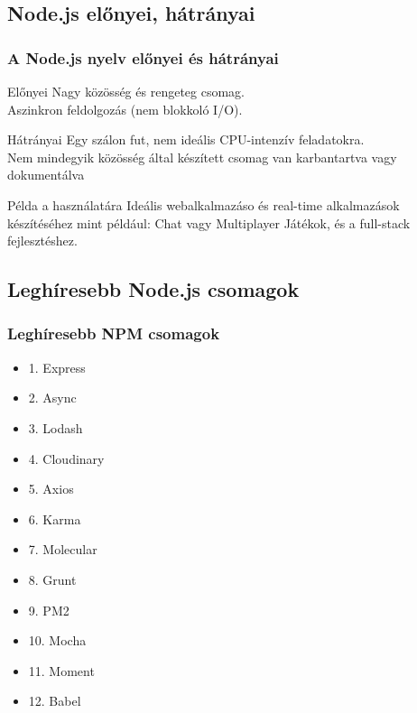 \documentclass[10pt]{beamer}
\begin{document}
	\subsection{Node.js előnyei, hátrányai}
	\begin{frame}
		\frametitle{A Node.js nyelv előnyei és hátrányai}

		\begin{block}{Előnyei}
			Nagy közösség és rengeteg csomag. \\ Aszinkron feldolgozás (nem blokkoló I/O).
		\end{block}
		\begin{alertblock}{Hátrányai}
			Egy szálon fut, nem ideális CPU-intenzív feladatokra. \\ Nem mindegyik közösség
			által készített csomag van karbantartva vagy dokumentálva
		\end{alertblock}
		\begin{exampleblock}{Példa a használatára}
			Ideális webalkalmazáso és real-time alkalmazások készítéséhez mint például:
			Chat vagy Multiplayer Játékok, és a full-stack fejlesztéshez.
		\end{exampleblock}
	\end{frame}

	\subsection{Leghíresebb Node.js csomagok}
	\begin{frame}
		\frametitle{Leghíresebb NPM csomagok}

		\begin{multicols}{3}
			\begin{itemize}
				\transglitter

				\item 1. Express

				\item 2. Async

				\item 3. Lodash

				\item 4. Cloudinary \pause \transglitter

				\item 5. Axios

				\item 6. Karma

				\item 7. Molecular

				\item 8. Grunt \pause \transglitter

				\item 9. PM2

				\item 10. Mocha

				\item 11. Moment

				\item 12. Babel
			\end{itemize}
		\end{multicols}
	\end{frame}
\end{document}
